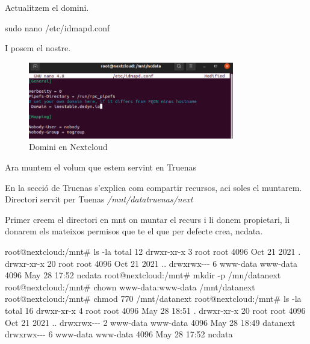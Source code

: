 \documentclass[
  10pt,
]{krantz}
\newenvironment{Shaded}{\begin{snugshade}}{\end{snugshade}}
\newcommand{\AttributeTok}[1]{\textcolor[rgb]{0.77,0.63,0.00}{#1}}
\newcommand{\ExtensionTok}[1]{#1}
\newcommand{\FunctionTok}[1]{\textcolor[rgb]{0.00,0.00,0.00}{#1}}
\newcommand{\NormalTok}[1]{#1}
\begin{document}
Actualitzem el domini.

\begin{Shaded}
\begin{Highlighting}[]
\FunctionTok{sudo}\NormalTok{ nano /etc/idmapd.conf}
\end{Highlighting}
\end{Shaded}

I posem el nostre.

\begin{figure}
\centering
\includegraphics[width=0.8\textwidth,height=\textheight]{imatges/proxmox/actualDominiNext.png}
\caption{Domini en Nextcloud}
\end{figure}

Ara muntem el volum que estem servint en Truenas

\begin{rmdinfo}{}
En la secció de Truenas s'explica com compartir recursos, aci soles el muntarem. Directori servit per Tuenas \emph{/mnt/datatruenas/next}

\end{rmdinfo}

Primer creem el directori en mnt on muntar el recurs i li donem propietari, li donarem els mateixos permisos que te el que per defecte crea, ncdata.

\begin{Shaded}
\begin{Highlighting}[]
\ExtensionTok{root@nextcloud:/mnt\#}\NormalTok{ ls }\AttributeTok{{-}la}
\ExtensionTok{total}\NormalTok{ 12}
\ExtensionTok{drwxr{-}xr{-}x}\NormalTok{  3 root     root     4096 Oct 21  2021 .}
\ExtensionTok{drwxr{-}xr{-}x}\NormalTok{ 20 root     root     4096 Oct 21  2021 ..}
\ExtensionTok{drwxrwx{-}{-}{-}}\NormalTok{  6 www{-}data www{-}data 4096 May 28 17:52 ncdata}
\ExtensionTok{root@nextcloud:/mnt\#}\NormalTok{ mkdir }\AttributeTok{{-}p}\NormalTok{ /mn/datanext}
\ExtensionTok{root@nextcloud:/mnt\#}\NormalTok{ chown www{-}data:www{-}data /mnt/datanext}
\ExtensionTok{root@nextcloud:/mnt\#}\NormalTok{ chmod 770 /mnt/datanext}
\ExtensionTok{root@nextcloud:/mnt\#}\NormalTok{ ls }\AttributeTok{{-}la}
\ExtensionTok{total}\NormalTok{ 16}
\ExtensionTok{drwxr{-}xr{-}x}\NormalTok{  4 root     root     4096 May 28 18:51 .}
\ExtensionTok{drwxr{-}xr{-}x}\NormalTok{ 20 root     root     4096 Oct 21  2021 ..}
\ExtensionTok{drwxrwx{-}{-}{-}}\NormalTok{  2 www{-}data www{-}data 4096 May 28 18:49 datanext}
\ExtensionTok{drwxrwx{-}{-}{-}}\NormalTok{  6 www{-}data www{-}data 4096 May 28 17:52 ncdata}
\end{Highlighting}
\end{Shaded}
\end{document}
